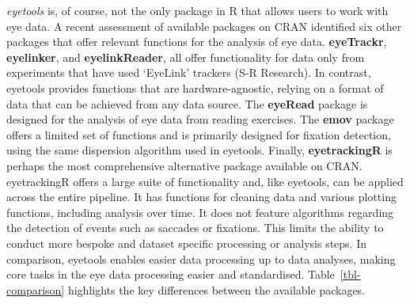 \documentclass[
  man,
  floatsintext,
  longtable,
  nolmodern,
  notxfonts,
  notimes,
  colorlinks=true,linkcolor=blue,citecolor=blue,urlcolor=blue]{apa7}
\begin{document}
\emph{eyetools} is, of course, not the only package in R that allows
users to work with eye data. A recent assessment of available packages
on CRAN identified six other packages that offer relevant functions for
the analysis of eye data. \textbf{eyeTrackr}, \textbf{eyelinker}, and
\textbf{eyelinkReader}, all offer functionality for data only from
experiments that have used `EyeLink' trackers (S-R Research). In
contrast, eyetools provides functions that are hardware-agnostic,
relying on a format of data that can be achieved from any data source.
The \textbf{eyeRead} package is designed for the analysis of eye data
from reading exercises. The \textbf{emov} package offers a limited set
of functions and is primarily designed for fixation detection, using the
same dispersion algorithm used in eyetools. Finally,
\textbf{eyetrackingR} is perhaps the most comprehensive alternative
package available on CRAN. eyetrackingR offers a large suite of
functionality and, like eyetools, can be applied across the entire
pipeline. It has functions for cleaning data and various plotting
functions, including analysis over time. It does not feature algorithms
regarding the detection of events such as saccades or fixations. This
limits the ability to conduct more bespoke and dataset specific
processing or analysis steps. In comparison, eyetools enables easier
data processing up to data analyses, making core tasks in the eye data
processing easier and standardised. Table~\ref{tbl-comparison}
highlights the key differences between the available packages.
\end{document}
